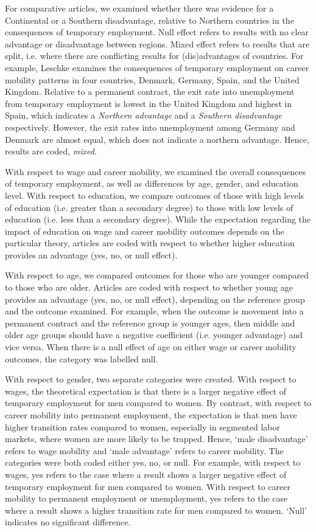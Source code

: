 \documentclass[12pt]{article}
\begin{document}
For comparative articles, we examined whether there was evidence for a Continental or a Southern disadvantage, relative to Northern countries in the consequences of temporary employment.  Null effect refers to results with no clear advantage or disadvantage between regions.  Mixed effect refers to results that are split, i.e. where there are conflicting results for (dis)advantages of countries.  For example, Leschke \citeyearpar[Table 4]{leschke_2009} examines the consequences of temporary employment on career mobility patterns in four countries, Denmark, Germany, Spain, and the United Kingdom.  Relative to a permanent contract, the exit rate into unemployment from temporary employment is lowest in the United Kingdom and highest in Spain, which indicates a \emph{Northern advantage} and a \emph{Southern disadvantage} respectively.  However, the exit rates into unemployment among Germany and Denmark are almost equal, which does not indicate a northern advantage.  Hence, results are coded, \emph{mixed}.  

With respect to wage and career mobility, we examined the overall consequences of temporary employment, as well as differences by age, gender, and education level.  With respect to education, we compare outcomes of those with high levels of education (i.e. greater than a secondary degree) to those with low levels of education (i.e. less than a secondary degree).  While the expectation regarding the impact of education on wage and career mobility outcomes depends on the particular theory, articles are coded with respect to whether higher education provides an advantage (yes, no, or null effect).  

With respect to age, we compared outcomes for those who are younger compared to those who are older.  Articles are coded with respect to whether young age provides an advantage (yes, no, or null effect), depending on the reference group and the outcome examined.  For example, when the outcome is movement into a permanent contract and the reference group is younger ages, then middle and older age groups should have a negative coefficient (i.e. younger advantage) and vice versa.  When there is a null effect of age on either wage or career mobility outcomes, the category was labelled null.  

With respect to gender, two separate categories were created.  With respect to wages, the theoretical expectation is that there is a larger negative effect of temporary employment for men compared to women.  By contrast, with respect to career mobility into permanent employment, the expectation is that men have higher transition rates compared to women, especially in segmented labor markets, where women are more likely to be trapped.  Hence, `male disadvantage' refers to wage mobility and `male advantage' refers to career mobility.  The categories were both coded either yes, no, or null.  For example, with respect to wages, yes refers to the case where a result shows a larger negative effect of temporary employment for men compared to women.  With respect to career mobility to permanent employment or unemployment, yes refers to the case where a result shows a higher transition rate for men compared to women.  `Null' indicates no significant difference.  
\end{document}
